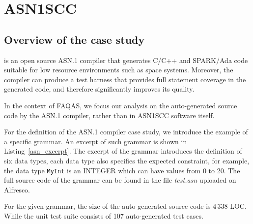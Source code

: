 
\clearpage

\section{ASN1SCC}
\label{sec:caseStudies:GSL:ASN1}

\subsection{Overview of the case study}

 is an open source ASN.1 compiler that generates C/C++ and SPARK/Ada code suitable for low resource environments such as space systems. Moreover, the compiler can produce a test harness that provides full statement coverage in the generated code, and therefore significantly improves its quality.


In the context of FAQAS, we focus our analysis on the auto-generated source code by the ASN.1 compiler, rather than in ASN1SCC software itself.

For the definition of the ASN.1 compiler case study, we introduce the example of a specific grammar. An excerpt of such grammar is shown in Listing~\ref{asn_excerpt}. 
The excerpt of the grammar introduces the definition of six data types, each data type also specifies the expected constraint, for example, the data type \texttt{MyInt} is an INTEGER which can have values from 0 to 20. The full source code of the grammar can be found in the file \emph{test.asn} uploaded on Alfresco.

For the given grammar, the size of the auto-generated source code is 4\,338 LOC. While the unit test suite consists of 107 auto-generated test cases.





